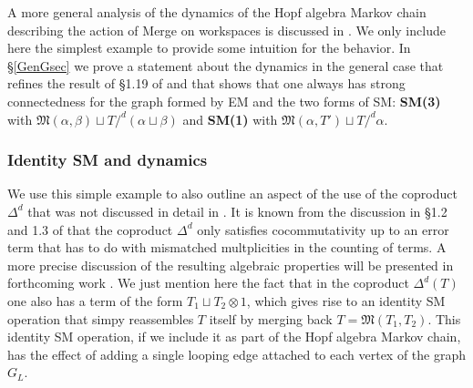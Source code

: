 \documentclass[12pt]{amsart}
\numberwithin{equation}{section}
\def\fM{{\mathfrak M}}
\begin{document}
\smallskip

A more general analysis of the
dynamics of the Hopf algebra Markov chain describing the action of Merge on workspaces 
is discussed in \cite{MarSkig}. We only include here the simplest example to provide some intuition
for the behavior. In \S \ref{GenGsec} we prove a statement about the dynamics in the general
case that refines the result of \S 1.19 of \cite{MCB} and that shows that one always has
strong connectedness for the graph formed by EM and the two forms of SM:
{\bf SM(3)} with $\fM(\alpha,\beta) \sqcup T/^d (\alpha \sqcup \beta)$ and 
{\bf SM(1)} with $\fM(\alpha, T') \sqcup T/^d \alpha$.


\smallskip
\subsubsection{Identity SM and dynamics}

We use this simple example to also outline an aspect of the use of the coproduct $\Delta^d$
that was not discussed in detail in \cite{MCB}. It is known from the discussion in \S 1.2
and 1.3 of \cite{MCB} that the coproduct $\Delta^d$ only satisfies cocommutativity up to
an error term that has to do with mismatched multplicities in the counting of terms. A more
precise discussion of the resulting algebraic properties will be presented in forthcoming
work \cite{MarWal}. We just mention here the fact that in the coproduct $\Delta^d(T)$
one also has a term of the form $T_1 \sqcup T_2 \otimes 1$, which gives rise to
an identity SM operation that simpy reassembles $T$ itself by merging back $T=\fM(T_1,T_2)$.
This identity SM operation, if we include it as part of the Hopf algebra Markov chain, has the
effect of adding a single looping edge attached to each vertex of the graph $G_L$.

\smallskip
\end{document}
